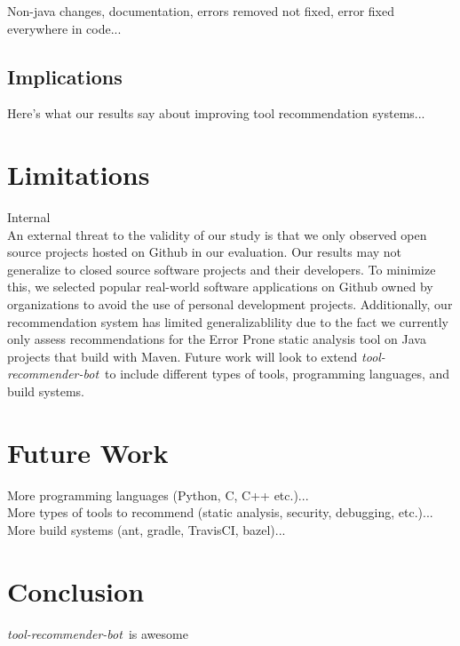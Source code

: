 \documentclass[conference]{IEEEtran}
\newcommand{\tool}{\textsl{tool-recommender-bot}}
\begin{document}
Non-java changes, documentation, errors removed not fixed, error fixed everywhere in code...

\subsection{Implications}

Here's what our results say about improving tool recommendation systems...

\section{Limitations}

Internal\\

An external threat to the validity of our study is that we only observed open source projects hosted on Github in our evaluation. Our results may not generalize to closed source software projects and their developers. To minimize this, we selected popular real-world software applications on Github owned by organizations to avoid the use of personal development projects. Additionally, our recommendation system has limited generalizablility due to the fact we currently only assess recommendations for the Error Prone static analysis tool on Java projects that build with Maven. Future work will look to extend \tool~to include different types of tools, programming languages, and build systems.

\section{Future Work}

More programming languages (Python, C, C++ etc.)...\\

More types of tools to recommend (static analysis, security, debugging, etc.)... \\

More build systems (ant, gradle, TravisCI, bazel)...\\

\section{Conclusion}

\tool~is awesome




  
%

\end{document}
